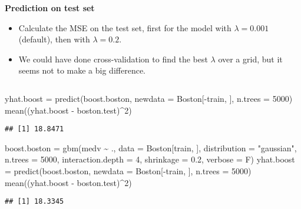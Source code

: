 \documentclass[
  10pt,
  ignorenonframetext,
]{beamer}
\newenvironment{Shaded}{\begin{snugshade}}{\end{snugshade}}
\newcommand{\AttributeTok}[1]{\textcolor[rgb]{0.77,0.63,0.00}{#1}}
\newcommand{\DecValTok}[1]{\textcolor[rgb]{0.00,0.00,0.81}{#1}}
\newcommand{\FloatTok}[1]{\textcolor[rgb]{0.00,0.00,0.81}{#1}}
\newcommand{\FunctionTok}[1]{\textcolor[rgb]{0.00,0.00,0.00}{#1}}
\newcommand{\NormalTok}[1]{#1}
\newcommand{\OtherTok}[1]{\textcolor[rgb]{0.56,0.35,0.01}{#1}}
\newcommand{\SpecialCharTok}[1]{\textcolor[rgb]{0.00,0.00,0.00}{#1}}
\newcommand{\StringTok}[1]{\textcolor[rgb]{0.31,0.60,0.02}{#1}}
\begin{document}
\begin{frame}[fragile]
\textbf{Prediction on test set}

\begin{itemize}
\item
  Calculate the MSE on the test set, first for the model with
  \(\lambda=0.001\) (default), then with \(\lambda=0.2\).
\item
  We could have done cross-validation to find the best \(\lambda\) over
  a grid, but it seems not to make a big difference.
\end{itemize}

\(~\)

\scriptsize

\begin{Shaded}
\begin{Highlighting}[]
\NormalTok{yhat.boost }\OtherTok{=} \FunctionTok{predict}\NormalTok{(boost.boston, }\AttributeTok{newdata =}\NormalTok{ Boston[}\SpecialCharTok{{-}}\NormalTok{train, ], }\AttributeTok{n.trees =} \DecValTok{5000}\NormalTok{)}
\FunctionTok{mean}\NormalTok{((yhat.boost }\SpecialCharTok{{-}}\NormalTok{ boston.test)}\SpecialCharTok{\^{}}\DecValTok{2}\NormalTok{)}
\end{Highlighting}
\end{Shaded}

\begin{verbatim}
## [1] 18.8471
\end{verbatim}

\vspace{2mm}

\begin{Shaded}
\begin{Highlighting}[]
\NormalTok{boost.boston }\OtherTok{=} \FunctionTok{gbm}\NormalTok{(medv }\SpecialCharTok{\textasciitilde{}}\NormalTok{ ., }\AttributeTok{data =}\NormalTok{ Boston[train, ], }\AttributeTok{distribution =} \StringTok{"gaussian"}\NormalTok{,}
    \AttributeTok{n.trees =} \DecValTok{5000}\NormalTok{, }\AttributeTok{interaction.depth =} \DecValTok{4}\NormalTok{, }\AttributeTok{shrinkage =} \FloatTok{0.2}\NormalTok{, }\AttributeTok{verbose =}\NormalTok{ F)}
\NormalTok{yhat.boost }\OtherTok{=} \FunctionTok{predict}\NormalTok{(boost.boston, }\AttributeTok{newdata =}\NormalTok{ Boston[}\SpecialCharTok{{-}}\NormalTok{train, ], }\AttributeTok{n.trees =} \DecValTok{5000}\NormalTok{)}
\FunctionTok{mean}\NormalTok{((yhat.boost }\SpecialCharTok{{-}}\NormalTok{ boston.test)}\SpecialCharTok{\^{}}\DecValTok{2}\NormalTok{)}
\end{Highlighting}
\end{Shaded}

\begin{verbatim}
## [1] 18.3345
\end{verbatim}
\end{frame}
\end{document}
